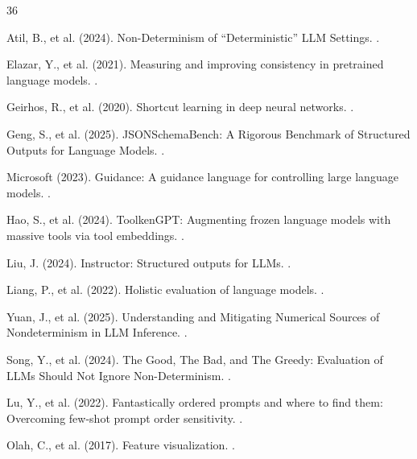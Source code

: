 \documentclass[sigconf,anonymous,review]{acmart}
\begin{document}

\begin{thebibliography}{36}

Atil, B., et al. (2024).
\newblock Non-Determinism of ``Deterministic'' LLM Settings.
.

Elazar, Y., et al. (2021).
\newblock Measuring and improving consistency in pretrained language models.
.

Geirhos, R., et al. (2020).
\newblock Shortcut learning in deep neural networks.
.

Geng, S., et al. (2025).
\newblock JSONSchemaBench: A Rigorous Benchmark of Structured Outputs for Language Models.
.

Microsoft (2023).
\newblock Guidance: A guidance language for controlling large language models.
.

Hao, S., et al. (2024).
\newblock ToolkenGPT: Augmenting frozen language models with massive tools via tool embeddings.
.

Liu, J. (2024).
\newblock Instructor: Structured outputs for LLMs.
.

Liang, P., et al. (2022).
\newblock Holistic evaluation of language models.
.

Yuan, J., et al. (2025).
\newblock Understanding and Mitigating Numerical Sources of Nondeterminism in LLM Inference.
.

Song, Y., et al. (2024).
\newblock The Good, The Bad, and The Greedy: Evaluation of LLMs Should Not Ignore Non-Determinism.
.

Lu, Y., et al. (2022).
\newblock Fantastically ordered prompts and where to find them: Overcoming few-shot prompt order sensitivity.
.

Olah, C., et al. (2017).
\newblock Feature visualization.
.


\end{thebibliography}
\end{document}
